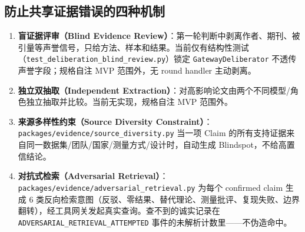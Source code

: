 \subsection{防止共享证据错误的四种机制}

\begin{enumerate}
\item \textbf{盲证据评审（Blind Evidence Review）}：第一轮判断中剥离作者、期刊、被引量等声誉信号，只给方法、样本和结果。当前仅有结构性测试（\texttt{test\_deliberation\_blind\_review.py}）锁定 \texttt{GatewayDeliberator} 不透传声誉字段；规格自注 MVP 范围外，无 round handler 主动剥离。
\item \textbf{独立双抽取（Independent Extraction）}：对高影响论文由两个不同模型/角色独立抽取并比较。当前无实现，规格自注 MVP 范围外。
\item \textbf{来源多样性约束（Source Diversity Constraint）}：\texttt{packages/evidence/source\_diversity.py} 当一项 Claim 的所有支持证据来自同一数据集/团队/国家/测量方式/设计时，自动生成 Blindspot，不给高置信结论。
\item \textbf{对抗式检索（Adversarial Retrieval）}：\texttt{packages/evidence/adversarial\_retrieval.py} 为每个 confirmed claim 生成 6 类反向检索意图（反驳、零结果、替代理论、测量批评、复现失败、边界翻转），经工具网关发起真实查询。查不到的诚实记录在 \texttt{ADVERSARIAL\_RETRIEVAL\_ATTEMPTED} 事件的未解析计数里——不伪造命中。
\end{enumerate}
